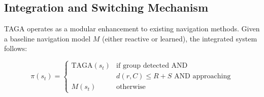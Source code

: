 \subsection{Integration and Switching Mechanism}

TAGA operates as a modular enhancement to existing navigation methods. Given a baseline navigation model $M$ (either reactive or learned), the integrated system follows:

\begin{equation}
\pi(s_t) = \begin{cases}
    \text{TAGA}(s_t) & \text{if group detected AND} \\
    & d(r, C) \leq R + S \text{ AND approaching} \\
    M(s_t) & \text{otherwise}
\end{cases}
\end{equation}







